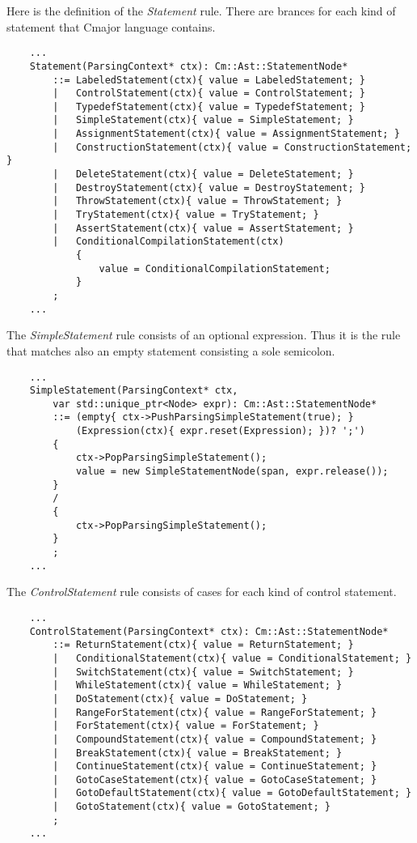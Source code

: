 \documentclass[a4paper,oneside,11pt]{book}
\theoremstyle{definition}
\begin{document}
Here is the definition of the \emph{Statement} rule.
There are brances for each kind of statement that
Cmajor language contains.

\lstset{language=cmpg}
\begin{lstlisting}
    ...
    Statement(ParsingContext* ctx): Cm::Ast::StatementNode*
        ::= LabeledStatement(ctx){ value = LabeledStatement; }
        |   ControlStatement(ctx){ value = ControlStatement; }
        |   TypedefStatement(ctx){ value = TypedefStatement; }
        |   SimpleStatement(ctx){ value = SimpleStatement; }
        |   AssignmentStatement(ctx){ value = AssignmentStatement; }
        |   ConstructionStatement(ctx){ value = ConstructionStatement; }
        |   DeleteStatement(ctx){ value = DeleteStatement; }
        |   DestroyStatement(ctx){ value = DestroyStatement; }
        |   ThrowStatement(ctx){ value = ThrowStatement; }
        |   TryStatement(ctx){ value = TryStatement; }
        |   AssertStatement(ctx){ value = AssertStatement; }
        |   ConditionalCompilationStatement(ctx)
            {
                value = ConditionalCompilationStatement;
            }
        ;
    ...
\end{lstlisting}

The \emph{SimpleStatement} rule consists of an optional expression.
Thus it is the rule that matches also an empty statement
consisting a sole semicolon.

\lstset{language=cmpg}
\begin{lstlisting}
    ...
    SimpleStatement(ParsingContext* ctx,
        var std::unique_ptr<Node> expr): Cm::Ast::StatementNode*
        ::= (empty{ ctx->PushParsingSimpleStatement(true); }
            (Expression(ctx){ expr.reset(Expression); })? ';')
        {
            ctx->PopParsingSimpleStatement();
            value = new SimpleStatementNode(span, expr.release());
        }
        /
        {
            ctx->PopParsingSimpleStatement();
        }
        ;
    ...
\end{lstlisting}

The \emph{ControlStatement} rule consists of cases for
each kind of control statement.

\lstset{language=cmpg}
\begin{lstlisting}
    ...
    ControlStatement(ParsingContext* ctx): Cm::Ast::StatementNode*
        ::= ReturnStatement(ctx){ value = ReturnStatement; }
        |   ConditionalStatement(ctx){ value = ConditionalStatement; }
        |   SwitchStatement(ctx){ value = SwitchStatement; }
        |   WhileStatement(ctx){ value = WhileStatement; }
        |   DoStatement(ctx){ value = DoStatement; }
        |   RangeForStatement(ctx){ value = RangeForStatement; }
        |   ForStatement(ctx){ value = ForStatement; }
        |   CompoundStatement(ctx){ value = CompoundStatement; }
        |   BreakStatement(ctx){ value = BreakStatement; }
        |   ContinueStatement(ctx){ value = ContinueStatement; }
        |   GotoCaseStatement(ctx){ value = GotoCaseStatement; }
        |   GotoDefaultStatement(ctx){ value = GotoDefaultStatement; }
        |   GotoStatement(ctx){ value = GotoStatement; }
        ;
    ...
\end{lstlisting}
\end{document}
